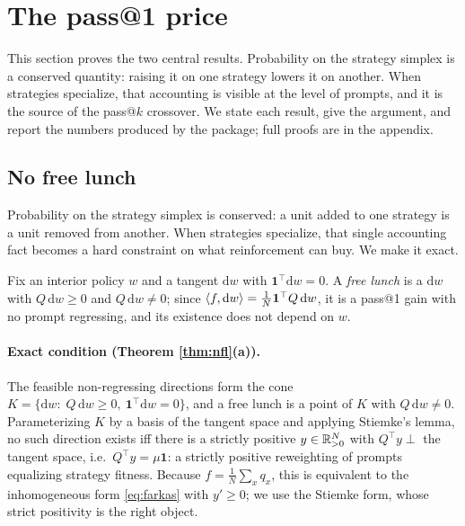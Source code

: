 \section{The pass@1 price}
\label{sec:price}

This section proves the two central results. Probability on the strategy simplex
is a conserved quantity: raising it on one strategy lowers it on another. When
strategies specialize, that accounting is visible at the level of prompts, and
it is the source of the pass@$k$ crossover. We state each result, give the
argument, and report the numbers produced by the package; full proofs are in the
appendix.

\subsection{No free lunch}
\label{sec:nfl}

Probability on the strategy simplex is conserved: a unit added to one strategy
is a unit removed from another. When strategies specialize, that single
accounting fact becomes a hard constraint on what reinforcement can buy. We make
it exact.

Fix an interior policy $w$ and a tangent $\mathrm{d}w$ with
$\mathbf{1}^{\top}\mathrm{d}w=0$. A \emph{free lunch} is a $\mathrm{d}w$ with
$Q\,\mathrm{d}w\ge0$ and $Q\,\mathrm{d}w\ne0$; since
$\langle f, \mathrm{d}w\rangle=\tfrac1N\mathbf 1^\top Q\,\mathrm{d}w$, it is a pass@1 gain
with no prompt regressing, and its existence does not depend on $w$.

\paragraph{Exact condition (Theorem \ref{thm:nfl}(a)).}
The feasible non-regressing directions form the cone
$K=\{\mathrm{d}w:\;Q\,\mathrm{d}w\ge0,\ \mathbf 1^\top\mathrm{d}w=0\}$, and a free
lunch is a point of $K$ with $Q\,\mathrm{d}w\ne0$. Parameterizing $K$ by a basis
of the tangent space and applying Stiemke's lemma, no such direction exists iff
there is a strictly positive $y\in\mathbb{R}^N_{>0}$ with $Q^\top y\perp$ the tangent
space, i.e.\ $Q^\top y=\mu\mathbf 1$: a strictly positive reweighting of prompts
equalizing strategy fitness. Because $f=\tfrac1N\sum_x q_x$, this is equivalent
to the inhomogeneous form \eqref{eq:farkas} with $y'\ge0$; we use the Stiemke
form, whose strict positivity is the right object.

